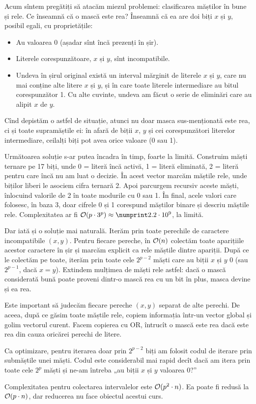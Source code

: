 \documentclass[../main.tex]{subfiles}
\begin{document}
Acum sîntem pregătiți să atacăm miezul problemei: clasificarea măștilor în bune și rele. Ce înseamnă că o mască este rea? Înseamnă că ea are doi biți $x$ și $y$, posibil egali, cu proprietățile:

\begin{itemize}
  \item Au valoarea 0 (așadar sînt încă prezenți în șir).

  \item Literele corespunzătoare, $x$ și $y$, sînt incompatibile.

  \item Undeva în șirul original există un interval mărginit de literele $x$ și $y$, care nu mai conține alte litere $x$ și $y$, și în care toate literele intermediare au bitul corespunzător 1. Cu alte cuvinte, undeva am făcut o serie de eliminări care au alipit $x$ de $y$.
\end{itemize}

Cînd depistăm o astfel de situație, atunci nu doar masca sus-menționată este rea, ci și toate supramăștile ei: în afară de biții $x$, $y$ și cei corespunzători literelor intermediare, ceilalți biți pot avea orice valoare (0 sau 1).

Următoarea soluție s-ar putea încadra în timp, foarte la limită. Construim măști ternare pe 17 biți, unde 0 = literă încă activă, 1 = literă eliminată, 2 = literă pentru care încă nu am luat o decizie. În acest vector marcăm măștile rele, unde biților liberi le asociem cifra ternară 2. Apoi parcurgem  recursiv aceste măști, înlocuind valorile de 2 în toate modurile cu 0 sau 1. În final, acele valori care folosesc, în baza 3, doar cifrele 0 și 1 corespund măștilor binare și descriu măștile rele. Complexitatea ar fi $\bigoh(p \cdot 3^p) \approx \np{2.2} \cdot 10^9$, la limită.

Dar iată și o soluție mai naturală. Iterăm prin toate perechile de caractere incompatibile $(x,y)$. Pentru fiecare pereche, în $\mathcal{O}(n)$ colectăm toate aparițiile acestor caractere în șir și marcăm explicit ca rele măștile dintre apariții. După ce le colectăm pe toate, iterăm prin toate cele $2^{p-2}$ măști care au biții $x$ și $y$ 0 (sau $2^{p-1}$, dacă $x=y$). Extindem mulțimea de măști rele astfel: dacă o mască considerată bună poate proveni dintr-o mască rea cu un bit în plus, masca devine și ea rea.

Este important să judecăm fiecare pereche $(x,y)$ separat de alte perechi. De aceea, după ce găsim toate măștile rele, copiem informația într-un vector global și golim vectorul curent. Facem copierea cu OR, întrucît o mască este rea dacă este rea din cauza oricărei perechi de litere.

Ca optimizare, pentru iterarea doar prin $2^{p-2}$ biți am folosit codul de iterare prin submăștile unei măști. Codul este considerabil mai rapid decît dacă am itera prin toate cele $2^p$ măști și ne-am întreba „au biții $x$ și $y$ valoarea 0?”

Complexitatea pentru colectarea intervalelor este $\mathcal{O}(p^2 \cdot n)$. Ea poate fi redusă la $\mathcal{O}(p \cdot n)$, dar reducerea nu face obiectul acestui curs.
\end{document}
